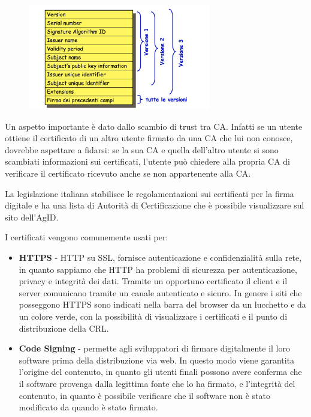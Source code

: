 \begin{figure}[htb!]
    \centering
    \includegraphics[width=8cm]{./Images/cap1/1.58.png}
\end{figure} 

Un aspetto importante è dato dallo scambio di trust tra CA. Infatti se un utente ottiene il certificato di un altro utente firmato da una CA che lui non conosce, dovrebbe aspettare a fidarsi: se la sua CA e quella dell'altro utente si sono scambiati informazioni sui certificati, l'utente può chiedere alla propria CA di verificare il certificato ricevuto anche se non appartenente alla CA. 

La legislazione italiana stabilisce le regolamentazioni sui certificati per la firma digitale e ha una lista di Autorità di Certificazione che è possibile visualizzare sul sito dell'AgID.

I certificati vengono comunemente usati per:
\begin{itemize}
    \item \textbf{HTTPS} - HTTP su SSL, fornisce autenticazione e confidenzialità sulla rete, in quanto sappiamo che HTTP ha problemi di sicurezza per autenticazione, privacy e integrità dei dati. Tramite un opportuno certificato il client e il server comunicano tramite un canale autenticato e sicuro. In genere i siti che posseggono HTTPS sono indicati nella barra del browser da un lucchetto e da un colore verde, con la possibilità di visualizzare i certificati e il punto di distribuzione della CRL.
    \item \textbf{Code Signing} - permette agli sviluppatori di firmare digitalmente il loro software prima della distribuzione via web. In questo modo viene garantita l'origine del contenuto, in quanto gli utenti finali possono avere conferma che il software provenga dalla legittima fonte che lo ha firmato, e l'integrità del contenuto, in quanto è possibile verificare che il software non è stato modificato da quando è stato firmato.
\end{itemize}


